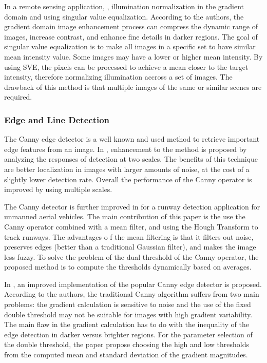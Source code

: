 In a remote sensing application, \cite{Illumination_normalization_among_multiple_remote_senging_images},	illumination normalization in the gradient domain and using singular	value equalization. According to the authors, the gradient domain image enhancement process can compress the dynamic range of images, increase contrast, and enhance fine details in darker regions. The goal of singular value equalization is to make all images in a specific set to have similar mean intensity value. Some images may have a lower or higher mean intensity. By using SVE, the pixels can be processed to achieve a mean closer to the target intensity, therefore normalizing illumination accross a set of images. The drawback of this method is that multiple images of the same or similar scenes are required.

\subsubsection{Edge and Line Detection}

The Canny edge detector is a well known and used method to retrieve important edge features from an image. In \cite{Canny_edge_detection_enhancement_scale_multiplication}, 	enhancement to the method is proposed by analyzing the responses of detection at two scales. The benefits of this technique are better localization in images with larger amounts of noise, at the cost of	a slightly lower detection rate. Overall the performance of the Canny operator is improved by using multiple scales.

The Canny detector is further improved in \cite{Runway_detection_tracking_unmanned} for a runway detection application for unmanned aerial vehicles. The main contribution of this paper is the use the Canny operator combined with a mean filter, and using the Hough Transform to track runways. The advantages o f the mean filtering is that it filters out noise, preserves edges (better than a traditional Gaussian filter), and makes the image less fuzzy. To solve the problem of the dual threshold of the Canny operator, the proposed method is to compute the thresholds dynamically based on averages.

In \cite{Improved_Canny_Edge_Detection}, an improved implementation of the popular Canny edge detector is proposed. According to the authors, the traditional Canny algorithm suffers from two main	problems: the gradient calculation is sensitive to noise and the use of the fixed double threshold may not be suitable for images with high gradient variability. The main flaw in the gradient calculation has to do with the inequality of the edge detection in darker versus brighter regions. For the parameter selection of the double threshold, the paper propose choosing the high and low thresholds from the computed mean and standard deviation of the gradient magnitudes.

